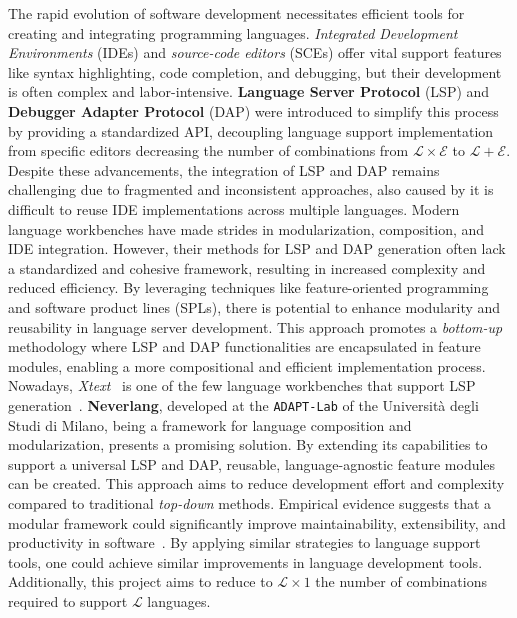 The rapid evolution of software development necessitates efficient tools for creating and integrating programming languages. \textit{Integrated Development Environments} (IDEs) and \textit{source-code editors} (SCEs) offer vital support features like syntax highlighting, code completion, and debugging, but their development is often complex and labor-intensive. \textbf{Language Server Protocol} (LSP) and \textbf{Debugger Adapter Protocol} (DAP) were introduced to simplify this process by providing a standardized API, decoupling language support implementation from specific editors decreasing the number of combinations from $\mathcal{L} \times \mathcal{E}$ to $\mathcal{L} + \mathcal{E}$. Despite these advancements, the integration of LSP and DAP remains challenging due to fragmented and inconsistent approaches, also caused by it is difficult to reuse IDE implementations across multiple languages. Modern language workbenches have made strides in modularization, composition, and IDE integration. However, their methods for LSP and DAP generation often lack a standardized and cohesive framework, resulting in increased complexity and reduced efficiency. By leveraging techniques like feature-oriented programming and software product lines (SPLs), there is potential to enhance modularity and reusability in language server development. This approach promotes a \textit{bottom-up} methodology where LSP and DAP functionalities are encapsulated in feature modules, enabling a more compositional and efficient implementation process. Nowadays, \textit{Xtext}~\cite{Bettini13b} is one of the few language workbenches that support LSP generation~\cite{Barros22}. \textbf{Neverlang}, developed at the \texttt{ADAPT-Lab} of the Università degli Studi di Milano, being a framework for language composition and modularization, presents a promising solution. By extending its capabilities to support a universal LSP and DAP, reusable, language-agnostic feature modules can be created. This approach aims to reduce development effort and complexity compared to traditional \textit{top-down} methods. Empirical evidence suggests that a modular framework could significantly improve maintainability, extensibility, and productivity in software~\cite{Sun17}. By applying similar strategies to language support tools, one could achieve similar improvements in language development tools. Additionally, this project aims to reduce to $\mathcal{L} \times 1$ the number of combinations required to support $\mathcal{L}$ languages.
